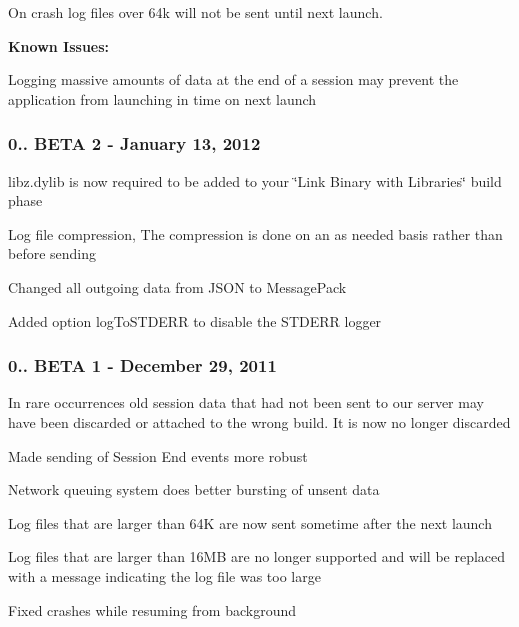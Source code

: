 \begin{DoxyItemize}
\item On crash log files over 64k will not be sent until next launch.
\end{DoxyItemize}

{\bfseries Known Issues\-:}


\begin{DoxyItemize}
\item Logging massive amounts of data at the end of a session may prevent the application from launching in time on next launch
\end{DoxyItemize}

\subsubsection*{0.. B\-E\-T\-A 2 -\/ January 13, 2012}


\begin{DoxyItemize}
\item libz.\-dylib is now required to be added to your \char`\"{}\-Link Binary with Libraries\char`\"{} build phase
\item Log file compression, The compression is done on an as needed basis rather than before sending
\item Changed all outgoing data from J\-S\-O\-N to Message\-Pack
\item Added option {\ttfamily log\-To\-S\-T\-D\-E\-R\-R} to disable the {\ttfamily S\-T\-D\-E\-R\-R} logger
\end{DoxyItemize}

\subsubsection*{0.. B\-E\-T\-A 1 -\/ December 29, 2011}


\begin{DoxyItemize}
\item In rare occurrences old session data that had not been sent to our server may have been discarded or attached to the wrong build. It is now no longer discarded
\item Made sending of Session End events more robust
\item Network queuing system does better bursting of unsent data
\item Log files that are larger than 64\-K are now sent sometime after the next launch
\item Log files that are larger than 16\-M\-B are no longer supported and will be replaced with a message indicating the log file was too large
\item Fixed crashes while resuming from background
\end{DoxyItemize}


